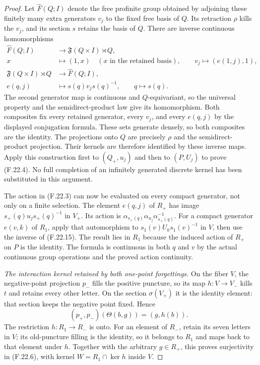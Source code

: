 \begin{proof}
Let $\widehat F(Q;I)$ denote the free profinite
group obtained by adjoining these finitely many
extra generators $v_j$ to the fixed free basis
of $Q$. Its retraction $\rho$ kills the $v_j$,
and its section $s$ retains the basis of $Q$.
There are inverse continuous homomorphisms
\[
 \begin{aligned}
 \widehat F(Q;I)&\longrightarrow
                     \mathfrak F(Q\times I)\rtimes Q,\\
 x&\longmapsto(1,x)\quad(x\text{ in the retained basis}),
       \qquad v_j\longmapsto(e(1,j),1),\\
 \mathfrak F(Q\times I)\rtimes Q
       &\longrightarrow\widehat F(Q;I),\\
 e(q,j)&\longmapsto s(q)v_js(q)^{-1},
       \qquad q\longmapsto s(q).
 \end{aligned}                                                \tag{F.22.15}
\]
The second generator map is continuous and
$Q$-equivariant, so the universal property and
the semidirect-product law give its homomorphism.
Both composites fix every retained generator,
every $v_j$, and every $e(q,j)$ by the displayed
conjugation formula. These sets generate densely,
so both composites are the identity. The
projections onto $Q$ are precisely $\rho$ and
the semidirect-product projection. Their kernels
are therefore identified by these inverse maps.
Apply this construction first to $(Q_+,u_j)$
and then to $(P,U_j)$ to prove (F.22.4).
No full completion of an infinitely generated
discrete kernel has been substituted in this
argument.

The action in (F.22.3) can now be evaluated
on every compact generator, not only on a
finite selection. The element $e(q,j)$ of
$R_+$ has image $s_+(q)u_js_+(q)^{-1}$ in
$V_+$. Its action is
$\alpha_{s_+(q)}\alpha_{u_j}\alpha_{s_+(q)}^{-1}$.
For a compact generator $e(v,k)$ of $R_1$,
apply that automorphism to
$s_1(v)U_ks_1(v)^{-1}$ in $V$, then use the
inverse of (F.22.15). The result lies in
$R_1$ because the induced action of $R_+$
on $P$ is the identity. The formula is
continuous in both $q$ and $v$ by the
actual continuous group operations and the
proved action continuity.

\emph{The interaction kernel retained by both one-point forgettings.}
On the fiber $V$, the negative-point projection
$p_-$ fills the positive puncture, so its map
$h:V\to V_-$ kills $t$ and retains every other
letter. On the section $\sigma(V_+)$ it is
the identity element: that section keeps the
negative point fixed. Hence
\[
        (p_+,p_-)(\Theta(b,g))=(g,h(b)).
                                                               \tag{F.22.16}
\]
The restriction $h:R_1\to R_-$ is onto.
For an element of $R_-$, retain its seven
letters in $V$; its old-puncture filling is
the identity, so it belongs to $R_1$ and
maps back to that element under $h$.
Together with the arbitrary $g\in R_+$,
this proves surjectivity in (F.22.6), with
kernel $W=R_1\cap\ker h$ inside $V$.


\end{proof}
